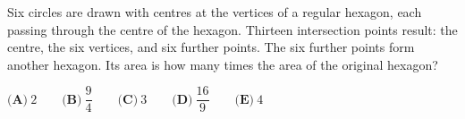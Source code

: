 Six circles are drawn with centres at the vertices of a regular hexagon, each passing through the centre of the hexagon. Thirteen intersection points result: the centre, the six vertices, and six further points. The six further points form another hexagon. Its area is how many times the area of the original hexagon?

$\textbf{(A)}\ 2\qquad\textbf{(B)}\ \dfrac94\qquad\textbf{(C)}\ 3\qquad\textbf{(D)}\ \dfrac{16}9\qquad\textbf{(E)}\ 4$
